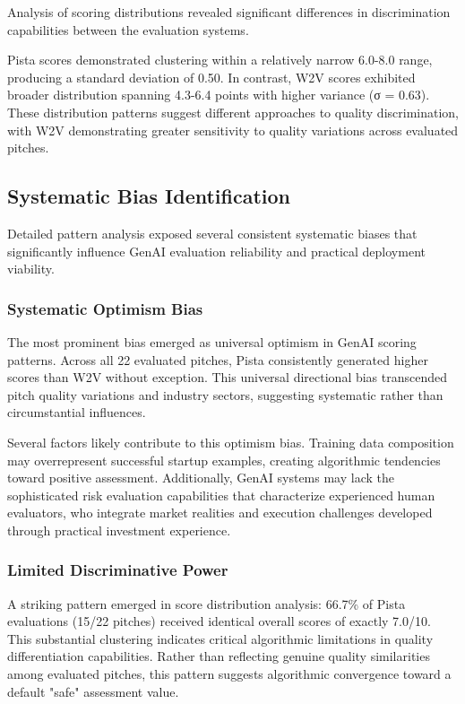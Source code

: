 Analysis of scoring distributions revealed significant differences in discrimination capabilities between the evaluation systems.

Pista scores demonstrated clustering within a relatively narrow 6.0-8.0 range, producing a standard deviation of 0.50. In contrast, W2V scores exhibited broader distribution spanning 4.3-6.4 points with higher variance (σ = 0.63). These distribution patterns suggest different approaches to quality discrimination, with W2V demonstrating greater sensitivity to quality variations across evaluated pitches.

\subsection{Systematic Bias Identification}
\label{subsec:bias}

Detailed pattern analysis exposed several consistent systematic biases that significantly influence GenAI evaluation reliability and practical deployment viability.

\subsubsection{Systematic Optimism Bias}

The most prominent bias emerged as universal optimism in GenAI scoring patterns. Across all 22 evaluated pitches, Pista consistently generated higher scores than W2V without exception. This universal directional bias transcended pitch quality variations and industry sectors, suggesting systematic rather than circumstantial influences.

Several factors likely contribute to this optimism bias. Training data composition may overrepresent successful startup examples, creating algorithmic tendencies toward positive assessment. Additionally, GenAI systems may lack the sophisticated risk evaluation capabilities that characterize experienced human evaluators, who integrate market realities and execution challenges developed through practical investment experience.

\subsubsection{Limited Discriminative Power}

A striking pattern emerged in score distribution analysis: 66.7\% of Pista evaluations (15/22 pitches) received identical overall scores of exactly 7.0/10. This substantial clustering indicates critical algorithmic limitations in quality differentiation capabilities. Rather than reflecting genuine quality similarities among evaluated pitches, this pattern suggests algorithmic convergence toward a default "safe" assessment value.

